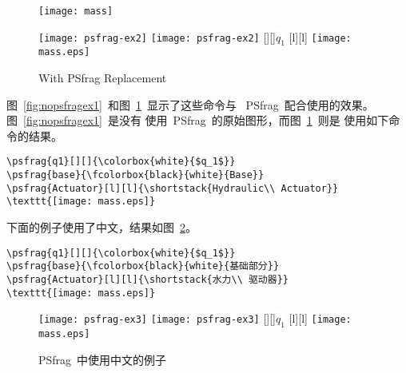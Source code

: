 \begin{figure}
\hspace{-1.5cm}
\begin{minipage}[b]{.7\textwidth}
\centering
\texttt{[image: mass]}
\caption{Without PSfrag Replacement}\label{fig:nopsfragex1}
\par\vspace{0pt}
\end{minipage}%
\hspace{-3cm}
\begin{minipage}[b]{.7\textwidth}
\ifpdf
\centering
\texttt{[image: psfrag-ex2]}
\else
\ifdvipdfm
\centering
\texttt{[image: psfrag-ex2]}
\else
{}[][]{\colorbox{white}{$q_1$}}
[l][l]{}
\centering
\texttt{[image: mass.eps]}
\fi
\fi
\caption{With PSfrag Replacement}\label{fig:psfragex2}
\par\vspace{0pt}
\end{minipage}
\end{figure}

图~\ref{fig:nopsfragex1}~和图~\ref{fig:psfragex2}~显示了这些命令与
~\textsf{PSfrag}~配合使用的效果。图~\ref{fig:nopsfragex1}~是没有
使用~\textsf{PSfrag}~的原始图形，而图~\ref{fig:psfragex2}~则是
使用如下命令的结果。
\begin{Verbatim}[xleftmargin=1cm]
\psfrag{q1}[][]{\colorbox{white}{$q_1$}}
\psfrag{base}{\fcolorbox{black}{white}{Base}}
\psfrag{Actuator}[l][l]{\shortstack{Hydraulic\\ Actuator}}
\texttt{[image: mass.eps]}
\end{Verbatim}

下面的例子使用了中文，结果如图~\ref{fig:psfragex3}。
\begin{Verbatim}[xleftmargin=1cm,formatcom=\color{VerbatimColor}\CJKfamily{kai}]
\psfrag{q1}[][]{\colorbox{white}{$q_1$}}
\psfrag{base}{\fcolorbox{black}{white}{基础部分}}
\psfrag{Actuator}[l][l]{\shortstack{水力\\ 驱动器}}
\texttt{[image: mass.eps]}
\end{Verbatim}

\begin{figure}
\ifpdf
\centering
\texttt{[image: psfrag-ex3]}
\else
\ifdvipdfm
\centering
\texttt{[image: psfrag-ex3]}
\else
{}[][]{\colorbox{white}{$q_1$}}
[l][l]{}
\centering
\texttt{[image: mass.eps]}
\fi
\fi
\caption{PSfrag~{中使用中文的例子}}\label{fig:psfragex3}
\end{figure}

